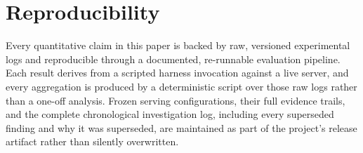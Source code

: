 \section*{Reproducibility}

Every quantitative claim in this paper is backed by raw, versioned experimental logs and reproducible through a documented, re-runnable evaluation pipeline. Each result derives from a scripted harness invocation against a live server, and every aggregation is produced by a deterministic script over those raw logs rather than a one-off analysis. Frozen serving configurations, their full evidence trails, and the complete chronological investigation log, including every superseded finding and why it was superseded, are maintained as part of the project's release artifact rather than silently overwritten.
